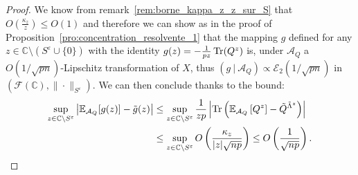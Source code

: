 \documentclass[a4papaer, titlepage]{book}
\begin{document}
\begin{proof}
  We know from remark~\ref{rem:borne_kappa_z_z_sur_S} that $O(\frac{\kappa_z}{z}) \leq O(1)$ and therefore we can show as in the proof of Proposition~\ref{pro:concentration_resolvente_1} that the mapping $g$ defined for any $z \in \mathbb C \setminus (S^\varepsilon \cup \{0\})$ with the identity $g(z) = -\frac{1}{pz}\operatorname{Tr}(Q^z)$ is, under $\mathcal A_Q$ a $O(1/\sqrt{pn})$-Lipschitz transformation of $X$, thus $(g \ | \ \mathcal A_Q) \propto \mathcal E_2(1/\sqrt{pn})$ in $(\mathcal F(\mathbb C), \|\cdot \|_{S^\varepsilon})$. 
    We can then conclude thanks to the bound:
  \begin{align*}
    \sup_{z \in \mathbb C \setminus S^\varepsilon} \left\vert \mathbb E_{\mathcal A_Q}[g(z)] - \tilde g(z)\right\vert 
    &\leq \sup_{z \in \mathbb C \setminus S^\varepsilon} \frac{1}{zp} \left\vert \operatorname{Tr} \left( \mathbb{E}_{\mathcal A_Q} \left[Q^z\right] - \tilde Q^{\tilde \Lambda^z}\right) \right\vert \\
    &\leq \sup_{z \in \mathbb C \setminus S^\varepsilon} O \left(\frac{\kappa_z}{|z|\sqrt {np}}\right) \leq O \left(\frac{1}{\sqrt{np}}\right).
  \end{align*}
\end{proof}
\end{document}
